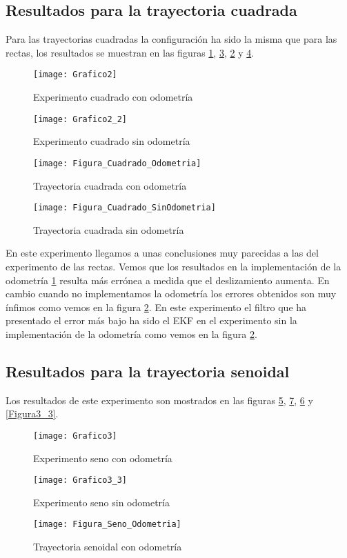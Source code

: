 \subsection{Resultados para la trayectoria cuadrada}
Para las trayectorias cuadradas la configuración ha sido la misma que para las rectas, los resultados se muestran en las figuras \ref{Grafico2}, \ref{Figura2}, \ref{Grafico2_2} y \ref{Figura2_2}.
\begin{figure}[ht!]
\centering
\texttt{[image: Grafico2]}
\caption{Experimento cuadrado con odometría} \label{Grafico2}
\end{figure}
\begin{figure}[ht!]
\centering
\texttt{[image: Grafico2\_2]}
\caption{Experimento cuadrado sin odometría} \label{Grafico2_2}
\end{figure}
\begin{figure}[ht!]
\centering
\texttt{[image: Figura\_Cuadrado\_Odometria]}
\caption{Trayectoria cuadrada con odometría} \label{Figura2}
\end{figure}
\begin{figure}[ht!]
\texttt{[image: Figura\_Cuadrado\_SinOdometria]}
\caption{Trayectoria cuadrada sin odometría} \label{Figura2_2}
\end{figure}
En este experimento llegamos a unas conclusiones muy parecidas a las del experimento de las rectas.
Vemos que los resultados en la implementación de la odometría \ref{Grafico2} resulta más errónea a medida que el deslizamiento aumenta.
En cambio cuando no implementamos la odometría los errores obtenidos son muy ínfimos como vemos en la figura \ref{Grafico2_2}.
En este experimento el filtro que ha presentado el error más bajo ha sido el \ac{EKF} en el experimento sin la implementación de la odometría como vemos en la figura \ref{Grafico2_2}.
\subsection{Resultados para la trayectoria senoidal}
Los resultados de este experimento son mostrados en las figuras \ref{Grafico3}, \ref{Figura3}, \ref{Grafico3_3} y \ref{Figura3_3}.
\begin{figure}[ht!]
\centering
\texttt{[image: Grafico3]}
\caption{Experimento seno con odometría} \label{Grafico3}
\end{figure}
\begin{figure}[ht!]
\centering
\texttt{[image: Grafico3\_3]}
\caption{Experimento seno sin odometría} \label{Grafico3_3}
\end{figure}
\begin{figure}[ht!]
\centering
\texttt{[image: Figura\_Seno\_Odometria]}
\caption{Trayectoria senoidal con odometría} \label{Figura3}
\end{figure}

